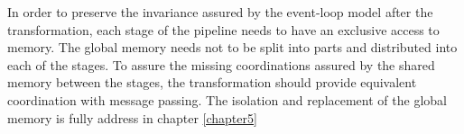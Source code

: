 In order to preserve the invariance assured by the event-loop model after the transformation, each stage of the pipeline needs to have an exclusive access to memory.
The global memory needs not to be split into parts and distributed into each of the stages.
To assure the missing coordinations assured by the shared memory between the stages, the transformation should provide equivalent coordination with message passing.
The isolation and replacement of the global memory is fully address in chapter \ref{chapter5}




